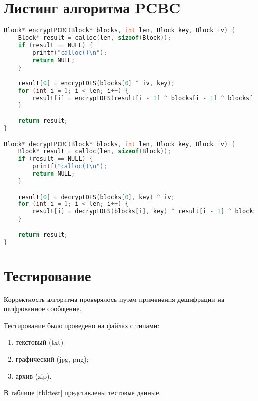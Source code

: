 \section{Листинг алгоритма PCBC}

\begin{lstlisting}[language=C, label=lst:pcbc, caption={Реализация алгоритма PCBC}]
Block* encryptPCBC(Block* blocks, int len, Block key, Block iv) {
    Block* result = calloc(len, sizeof(Block));
    if (result == NULL) {
        printf("calloc()\n");
        return NULL;
    }

    result[0] = encryptDES(blocks[0] ^ iv, key);
    for (int i = 1; i < len; i++) {
        result[i] = encryptDES(result[i - 1] ^ blocks[i - 1] ^ blocks[i], key);
    }

    return result;
}

Block* decryptPCBC(Block* blocks, int len, Block key, Block iv) {
    Block* result = calloc(len, sizeof(Block));
    if (result == NULL) {
        printf("calloc()\n");
        return NULL;
    }

    result[0] = decryptDES(blocks[0], key) ^ iv;
    for (int i = 1; i < len; i++) {
        result[i] = decryptDES(blocks[i], key) ^ result[i - 1] ^ blocks[i - 1];
    }

    return result;
}
\end{lstlisting}	



\section{Тестирование}

Корректность алгоритма проверялось путем применения дешифрации на шифрованное сообщение.

Тестирование было проведено на файлах с типами:

\begin{enumerate}[label=\arabic*)]
	\item текстовый (txt);
	\item графический (jpg, png);
	\item архив (zip).
\end{enumerate}



В таблице \ref{tbl:test} представлены тестовые данные.

